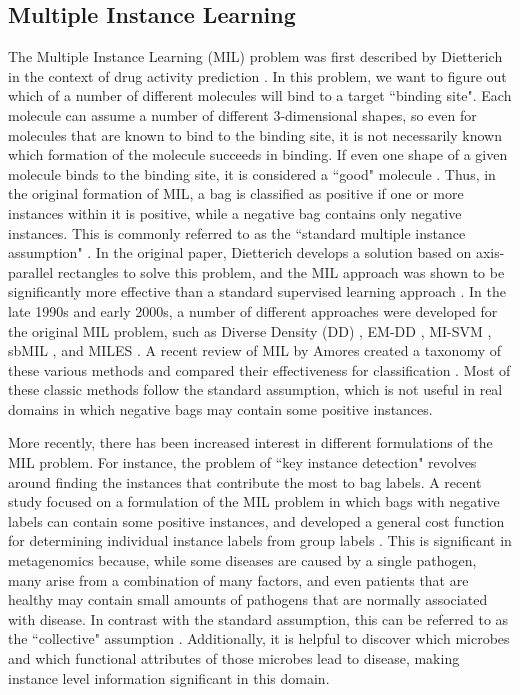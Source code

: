 
\subsection{Multiple Instance Learning}

The Multiple Instance Learning (MIL) problem was first described by Dietterich in the context of drug activity prediction \cite{dietterich97}. In this problem, we want to figure out which of a number of different molecules will bind to a target ``binding site". Each molecule can assume a number of different 3-dimensional shapes, so even for molecules that are known to bind to the binding site, it is not necessarily known which formation of the molecule succeeds in binding. If even one shape of a given molecule binds to the binding site, it is considered a ``good" molecule \cite{dietterich97}. Thus, in the original formation of MIL, a bag is classified as positive if one or more instances within it is positive, while a negative bag contains only negative instances. This is commonly referred to as the ``standard multiple instance assumption" \cite{amores13}. In the original paper, Dietterich develops a solution based on axis-parallel rectangles to solve this problem, and the MIL approach was shown to be significantly more effective than a standard supervised learning approach \cite{dietterich97}. In the late 1990s and early 2000s, a number of different approaches were developed for the original MIL problem, such as Diverse Density (DD) \cite{perez98}, EM-DD \cite{zhang01}, MI-SVM \cite{andrews02}, sbMIL \cite{bunescu07}, and MILES \cite{wang06}. A recent review of MIL by Amores created a taxonomy of these various methods and compared their effectiveness for classification \cite{amores13}. Most of these classic methods follow the standard assumption, which is not useful in real domains in which negative bags may contain some positive instances.
%

More recently, there has been increased interest in different formulations of the MIL problem. For instance, the problem of ``key instance detection" \cite{zhou12} revolves around finding the instances that contribute the most to bag labels. A recent study focused on a formulation of the MIL problem in which bags with negative labels can contain some positive instances, and developed a general cost function for determining individual instance labels from group labels \cite{kotzias15}. This is significant in metagenomics because, while some diseases are caused by a single pathogen, many arise from a combination of many factors, and even patients that are healthy may contain small amounts of pathogens that are normally associated with disease. In contrast with the standard assumption, this can be referred to as the ``collective" assumption \cite{amores13}. Additionally, it is helpful to discover which microbes and which functional attributes of those microbes lead to disease, making instance level information significant in this domain.
%

